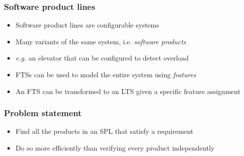 \documentclass[aspectratio=169]{beamer}
\begin{document}
\begin{frame}[t]
\frametitle{Software product lines}
\begin{itemize}
	\item Software product lines are configurable systems
	\item Many variants of the same system, i.e. \textit{software products}
	\item \textit{e.g.} an elevator that can be configured to detect overload\pause
	\item FTSs can be used to model the entire system using \textit{features}\pause
	\item An FTS can be transformed to an LTS given a specific feature assignment
\end{itemize}
\end{frame}

\begin{frame}[t]
\frametitle{Problem statement}
	\begin{itemize}
		\item Find all the products in an SPL that satisfy a requirement
	\end{itemize}
	\begin{center}
	\end{center}
	\begin{itemize}
		\item Do so more efficiently than verifying every product independently
	\end{itemize}
\end{frame}

\end{document}
